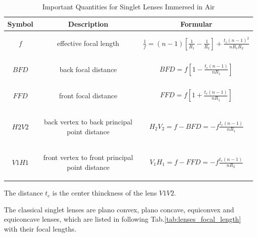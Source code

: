 \begin{table}
\begin{tabular}{|c|c|c|}
\hline
\textbf{Symbol}&\textbf{Description}&\textbf{Formular}\\
\hline
$f$ & \parbox[c]{6cm}{
						\begin{center}
						effective focal length
						\end{center}
				}& $\frac{1}{f}=(n-1)\left[\frac{1}{R_{1}}-\frac{1}{R_{2}} \right]+\frac{t_{c}(n-1)^2}{nR_{1}R_{2}}$ \\
\hline
$BFD$ &\parbox[c]{6cm}{
						\begin{center}
						back focal distance 
						\end{center}
			}& $BFD=f\left[ 1-\frac{t_{c}(n-1)}{nR_{1}}\right]$ \\
\hline
$FFD$ &\parbox[c]{6cm}{
						\begin{center}
						 front focal distance
						 \end{center} 
			}& $FFD=f\left[ 1+\frac{t_{c}(n-1)}{nR_{1}}\right]$ \\
\hline
$H2V2$ & \parbox[c]{6cm}{
						\begin{center}
						back vertex to back principal point distance
						\end{center}						
			} & $H_{2}V_{2}=f-BFD=-f\frac{t_{c}(n-1)}{nR_{1}}$ \\
\hline
$V1H1$ & \parbox[c]{6cm}{
						\begin{center}			
				    front vertex to front principal point distance
				    \end{center}
				 } & $V_{1}H_{1}=f-FFD=-f\frac{t_{c}(n-1)}{nR_{2}}$ \\
\hline
\end{tabular}
\caption{Important Quantities for Singlet Lenses Immersed in Air}
\label{tab:lens_quantities}
\end{table}


The distance $t_{c}$ is the center thinckness of the lens $V1V2$. 






The classical singlet lenses are plano convex, plano concave, equiconvex and equiconcave lenses, which are listed in following Tab.\ref{tab:lenses_focal_length} with their focal lengths.

